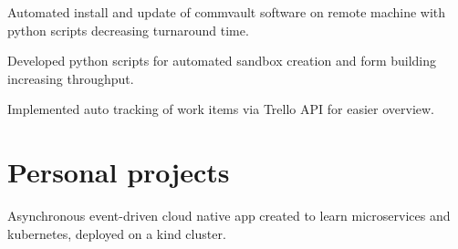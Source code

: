 \documentclass[]{font}
\begin{document}
\begin{minipage}[t]{0.66\textwidth}
\begin{tightemize}
\item Automated install and update of commvault software on remote machine with python scripts decreasing turnaround time.
\item Developed python scripts for automated sandbox creation and form building increasing throughput. 
\item Implemented auto tracking of work items via Trello API for easier overview.
\end{tightemize}    
\sectionsep




\sectionsep



\section{Personal projects}

Asynchronous event-driven cloud native app created to learn microservices and kubernetes, deployed on a kind cluster.
\sectionsep


\end{minipage}
\end{document}
